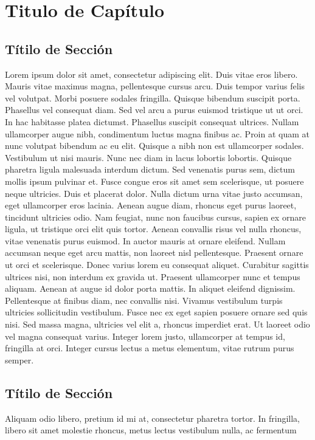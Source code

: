 \chapter{Titulo de Capítulo} \section{Títilo de Sección} Lorem ipsum dolor sit
amet, consectetur adipiscing elit. Duis vitae eros libero. Mauris vitae maximus
magna, pellentesque cursus arcu. Duis tempor varius felis vel volutpat. Morbi
posuere sodales fringilla. Quisque bibendum suscipit porta. Phasellus vel
consequat diam. Sed vel arcu a purus euismod tristique ut ut orci. In hac
habitasse platea dictumst. Phasellus suscipit consequat ultrices. Nullam
ullamcorper augue nibh, condimentum luctus magna finibus ac. Proin at quam at
nunc volutpat bibendum ac eu elit. Quisque a nibh non est ullamcorper sodales.
Vestibulum ut nisi mauris. Nunc nec diam in lacus lobortis lobortis. Quisque
pharetra ligula malesuada interdum dictum. Sed venenatis purus sem, dictum
mollis ipsum pulvinar et. Fusce congue eros sit amet sem scelerisque, ut posuere
neque ultricies. Duis et placerat dolor. Nulla dictum urna vitae justo accumsan,
eget ullamcorper eros lacinia. Aenean augue diam, rhoncus eget purus laoreet,
tincidunt ultricies odio. Nam feugiat, nunc non faucibus cursus, sapien ex
ornare ligula, ut tristique orci elit quis tortor. Aenean convallis risus vel
nulla rhoncus, vitae venenatis purus euismod. In auctor mauris at ornare
eleifend. Nullam accumsan neque eget arcu mattis, non laoreet nisl pellentesque.
Praesent ornare ut orci et scelerisque. Donec varius lorem eu consequat aliquet.
Curabitur sagittis ultrices nisi, non interdum ex gravida ut. Praesent
ullamcorper nunc et tempus aliquam. Aenean at augue id dolor porta mattis. In
aliquet eleifend dignissim. Pellentesque at finibus diam, nec convallis nisi.
Vivamus vestibulum turpis ultricies sollicitudin vestibulum. Fusce nec ex eget
sapien posuere ornare sed quis nisi. Sed massa magna, ultricies vel elit a,
rhoncus imperdiet erat. Ut laoreet odio vel magna consequat varius. Integer
lorem justo, ullamcorper at tempus id, fringilla at orci. Integer cursus lectus
a metus elementum, vitae rutrum purus semper. \section{Títilo de Sección}
Aliquam odio libero, pretium id mi at, consectetur pharetra tortor. In fringilla,
libero sit amet molestie rhoncus, metus lectus vestibulum nulla, ac fermentum
